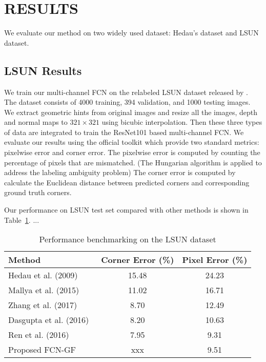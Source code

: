 \section{RESULTS}
\label{sec:Res}

We evaluate our method on two widely used dataset: Hedau's dataset \cite{hedau2009recovering} and LSUN dataset.
\subsection{LSUN Results}
\label{sec:LSUN}
We train our multi-channel FCN on the relabeled LSUN dataset released by \cite{ren2016coarse}. The dataset consists of 4000 training, 394 validation, and 1000 testing images. We extract geometric hints from original images and resize all the images, depth and normal maps to $321\times321$ using bicubic interpolation. Then these three types of data are integrated to train the ResNet101 based multi-channel FCN. We evaluate our results using the official toolkit which provide two standard metrics: pixelwise error and corner error. The pixelwise error is computed by counting the percentage of pixels that are mismatched. (The Hungarian algorithm is applied to address the labeling ambiguity problem) The corner error is computed by calculate the Euclidean distance between predicted corners and corresponding ground truth corners.

Our performance on LSUN test set compared with other methods is shown in Table~\ref{table:comparison-lsun}. ... 

\begin{table}
	\centering 
	\caption{Performance benchmarking on the LSUN dataset}
	\label{table:comparison-lsun}
	\begin{tabular}{l|c|c}
		\hline 
		Method & Corner Error (\%) & Pixel Error (\%) \\
		\hline
		Hedau et al. (2009)~\cite{hedau2009recovering} & 15.48 & 24.23 \\
		Mallya et al. (2015)~\cite{mallya2015learning} & 11.02 & 16.71 \\
		Zhang et al. (2017)~\cite{zhang2017learning} & 8.70 & 12.49 \\
		Dasgupta et al. (2016)~\cite{dasgupta2016delay} & 8.20 & 10.63 \\
		Ren et al. (2016)~\cite{ren2016three} & 7.95 & 9.31 \\
		Proposed FCN-GF & xxx & 9.51 \\
		\hline
	\end{tabular}
\end{table}


